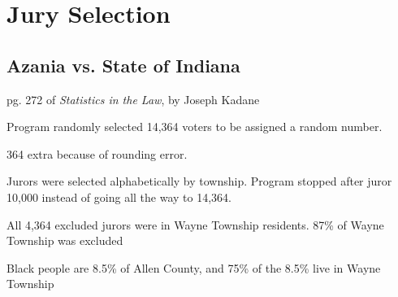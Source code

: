 \documentclass[landscape]{exam}
\begin{document}

    
    



  \section{Jury Selection}

  \subsection{Azania vs. State of Indiana}

  pg. 272 of {\em Statistics in the Law}, by Joseph Kadane

  \begin{itemize*}
    \item Program randomly selected 14,364 voters to be assigned a random
      number.
    \item 364 extra because of rounding error.
    \item Jurors were selected alphabetically by township.  Program stopped
      after juror 10,000 instead of going all the way to 14,364.    
    \item All 4,364 excluded jurors were in Wayne Township residents.  87\% of
      Wayne Township was excluded
    \item Black people are 8.5\% of Allen County, and 75\% of the 8.5\% live in
      Wayne Township
  \end{itemize*}
\end{document}

